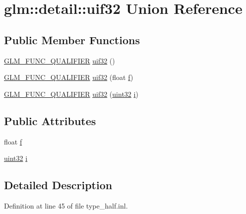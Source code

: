 \hypertarget{unionglm_1_1detail_1_1uif32}{}\section{glm\+:\+:detail\+:\+:uif32 Union Reference}
\label{unionglm_1_1detail_1_1uif32}
\subsection*{Public Member Functions}
\begin{DoxyCompactItemize}
\item 
\hyperlink{setup_8hpp_a33fdea6f91c5f834105f7415e2a64407}{G\+L\+M\+\_\+\+F\+U\+N\+C\+\_\+\+Q\+U\+A\+L\+I\+F\+I\+ER} \hyperlink{unionglm_1_1detail_1_1uif32_a185c257ac32e21727191ba7e52d97e3e}{uif32} ()
\item 
\hyperlink{setup_8hpp_a33fdea6f91c5f834105f7415e2a64407}{G\+L\+M\+\_\+\+F\+U\+N\+C\+\_\+\+Q\+U\+A\+L\+I\+F\+I\+ER} \hyperlink{unionglm_1_1detail_1_1uif32_ae86c2bd42a88f11e3217d14e46606971}{uif32} (float \hyperlink{unionglm_1_1detail_1_1uif32_a5f697f84c5a8ec72c2f3a4f705f5bde8}{f})
\item 
\hyperlink{setup_8hpp_a33fdea6f91c5f834105f7415e2a64407}{G\+L\+M\+\_\+\+F\+U\+N\+C\+\_\+\+Q\+U\+A\+L\+I\+F\+I\+ER} \hyperlink{unionglm_1_1detail_1_1uif32_a3d5981678c930776894daf8e94295fe2}{uif32} (\hyperlink{namespaceglm_1_1detail_ade6cfbf377022aaa391af8cd50489222}{uint32} \hyperlink{unionglm_1_1detail_1_1uif32_a981c1c59e160db23c73908cd7e629229}{i})
\end{DoxyCompactItemize}
\subsection*{Public Attributes}
\begin{DoxyCompactItemize}
\item 
float \hyperlink{unionglm_1_1detail_1_1uif32_a5f697f84c5a8ec72c2f3a4f705f5bde8}{f}
\item 
\hyperlink{namespaceglm_1_1detail_ade6cfbf377022aaa391af8cd50489222}{uint32} \hyperlink{unionglm_1_1detail_1_1uif32_a981c1c59e160db23c73908cd7e629229}{i}
\end{DoxyCompactItemize}


\subsection{Detailed Description}


Definition at line 45 of file type\+\_\+half.\+inl.



